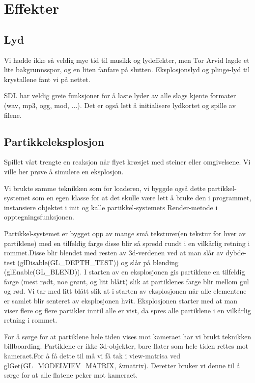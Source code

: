 \documentclass[11pt, dvips]{report}
\begin{document}
\chapter{Effekter}\label{fx}

\section{Lyd}

Vi hadde ikke så veldig mye tid til musikk og lydeffekter, men Tor
Arvid lagde et lite bakgrunnsspor, og en liten fanfare på slutten.
Eksplosjonslyd og plinge-lyd til krystallene fant vi på nettet.

SDL har veldig greie funksjoner for å laste lyder av alle slags kjente
formater (wav, mp3, ogg, mod, ...). Det er også lett å initialisere
lydkortet og spille av filene.

\section{Partikkeleksplosjon}

Spillet vårt trengte en reaksjon når flyet kræsjet med steiner eller
omgivelsene. Vi ville her prøve å simulere en eksplosjon.

Vi brukte samme teknikken som for loaderen, vi byggde også dette
partikkel-systemet som en egen klasse for at det skulle være lett å
bruke den i programmet, instansiere objektet i init og kalle
partikkel-systemets Render-metode i opptegningsfunksjonen.

Partikkel-systemet er bygget opp av mange små teksturer(en tekstur for
hver av partiklene) med en tilfeldig farge disse blir så spredd rundt
i en vilkårlig retning i rommet.Disse blir blendet med resten av
3d-verdenen ved at man slår av dybde-test (glDisable(GL\_DEPTH\_TEST))
og slår på blending (glEnable(GL\_BLEND)). I starten av en
eksplosjonen gis partiklene en tilfeldig farge (mest rødt, noe grønt,
og litt blått) slik at partiklenes farge blir mellom gul og rød. Vi
tar med litt blått slik at i starten av eksplosjonen når alle
elementene er samlet blir  senteret av eksplosjonen hvit. Eksplosjonen
starter med at man viser flere og flere partikler inntil alle er vist,
da spres alle partiklene i en vilkårlig retning i rommet.

For å sørge for at partiklene hele tiden vises mot kameraet har vi
brukt teknikken billboarding. Partiklene er ikke 3d-objekter, bare
flater som hele tiden rettes mot kameraet.For å få dette til må vi få
tak i view-matrisa ved glGet(GL\_MODELVIEV\_MATRIX, \&matrix). Deretter
bruker vi denne til å sørge for at alle flatene peker mot kameraet.
\end{document}

